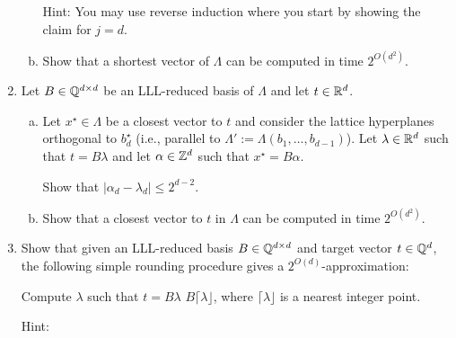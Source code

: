\begin{enumerate}
\begin{enumerate}[(a)]
        Hint: You may use reverse induction where you start by showing the claim for $j = d$.

      \item Show that a shortest vector of $\Lambda$ can be computed in time $2^{O(d^2)}$.
    \end{enumerate}

  \item
    Let $B \in \mathbb{Q}^{d \times d}$ be an LLL-reduced basis of $\Lambda$ and let $t \in \mathbb{R}^d$.
    \begin{enumerate}[(a)]
      \item Let $x^\star \in \Lambda$ be a closest vector to $t$ and consider the lattice hyperplanes
        orthogonal to $b_d^\star$ (i.e., parallel to $\Lambda' := \Lambda(b_1,\ldots,b_{d-1})$).
        Let $\lambda \in \mathbb{R}^d$ such that $t = B \lambda$
        and let $\alpha \in \mathbb{Z}^d$ such that $x^\star = B \alpha$.

        Show that $|\alpha_d - \lambda_d| \leq 2^{d-2}$.

      \item Show that a closest vector to $t$ in $\Lambda$ can be computed in time $2^{O(d^2)}$.
    \end{enumerate}

  \item
    Show that given an LLL-reduced basis $B \in \mathbb{Q}^{d \times d}$ and target vector $t \in \mathbb{Q}^d$,
    the following simple rounding procedure gives a $2^{O(d)}$-approximation:
    \begin{codebox}
      \li Compute $\lambda$ such that $t = B \lambda$
      \li \Return $B \lceil \lambda \rfloor$, where $\lceil \lambda \rfloor$ is a nearest integer point.
    \end{codebox}

    Hint: \cite{MR856638}
\end{enumerate}
